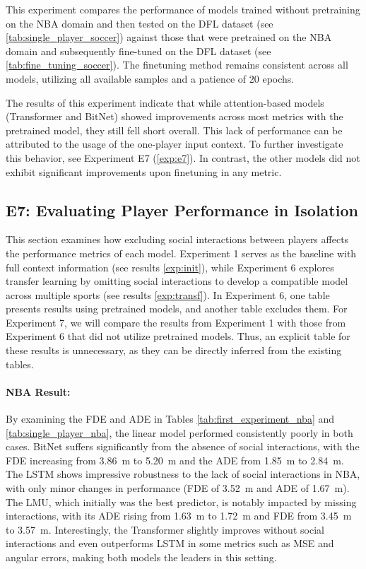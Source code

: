 \newpage
This experiment compares the performance of models trained without pretraining on the NBA domain and then tested on the DFL dataset (see \ref{tab:single_player_soccer}) against those that were pretrained on the NBA domain and subsequently fine-tuned on the DFL dataset (see \ref{tab:fine_tuning_soccer}). The finetuning method remains consistent across all models, utilizing all available samples and a patience of 20 epochs.

The results of this experiment indicate that while attention-based models (Transformer and BitNet) showed improvements across most metrics with the pretrained model, they still fell short overall. This lack of performance can be attributed to the usage of the one-player input context. To further investigate this behavior, see Experiment E7 (\ref{exp:e7}). In contrast, the other models did not exhibit significant improvements upon finetuning in any metric.

\FloatBarrier
\subsection{E7: Evaluating Player Performance in Isolation}
This section examines how excluding social interactions between players affects the performance metrics of each model. Experiment 1 serves as the baseline with full context information (see results \ref{exp:init}), while Experiment 6 explores transfer learning by omitting social interactions to develop a compatible model across multiple sports (see results \ref{exp:transf}). In Experiment 6, one table presents results using pretrained models, and another table excludes them. For Experiment 7, we will compare the results from Experiment 1 with those from Experiment 6 that did not utilize pretrained models. Thus, an explicit table for these results is unnecessary, as they can be directly inferred from the existing tables.

\label{exp:single_vs_all}
\paragraph {NBA Result:}
By examining the FDE and ADE in Tables \ref{tab:first_experiment_nba} and \ref{tab:single_player_nba}, the linear model performed consistently poorly in both cases. BitNet suffers significantly from the absence of social interactions, with the FDE increasing from \SI{3.86}{\meter} to \SI{5.20}{\meter} and the ADE from \SI{1.85}{\meter} to \SI{2.84}{\meter}. The LSTM shows impressive robustness to the lack of social interactions in NBA, with only minor changes in performance (FDE of \SI{3.52}{\meter} and ADE of \SI{1.67}{\meter}). The LMU, which initially was the best predictor, is notably impacted by missing interactions, with its ADE rising from \SI{1.63}{\meter} to \SI{1.72}{\meter} and FDE from \SI{3.45}{\meter} to \SI{3.57}{\meter}. Interestingly, the Transformer slightly improves without social interactions and even outperforms LSTM in some metrics such as MSE and angular errors, making both models the leaders in this setting.


